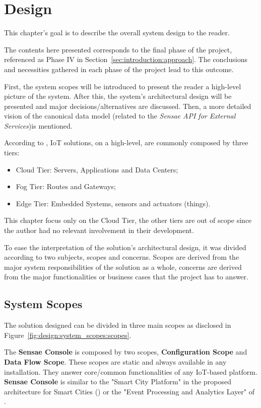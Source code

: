 \chapter{Design}
\label{chap:design}

This chapter's goal is to describe the overall system design to the reader.

The contents here presented corresponds to the final phase of the project, referenced as Phase IV in Section~\ref{sec:introduction:approach}. The conclusions and necessities gathered in each phase of the project lead to this outcome. 

First, the system scopes will be introduced to present the reader a high-level picture of the system. After this, the system's architectural design will be presented and major decisions/alternatives are discussed. Then, a more detailed vision of the canonical data model (related to the \textit{Sensae API for External Services})is mentioned.

According to \cite{DIAS2022100529}, \gls{IoT} solutions, on a high-level, are commonly composed by three tiers:

\begin{itemize}
   \item Cloud Tier: Servers, Applications and Data Centers;
   \item Fog Tier: Routes and Gateways;
   \item Edge Tier: Embedded Systems, sensors and actuators (things).
\end{itemize}

This chapter focus only on the Cloud Tier, the other tiers are out of scope since the author had no relevant involvement in their development.

To ease the interpretation of the solution's architectural design, it was divided according to two subjects, scopes and concerns.
Scopes are derived from the major system responsibilities of the solution as a whole, concerns are derived from the major functionalities or business cases that the project has to answer.

\section{System Scopes}
\label{sec:design:system_scopes}

The solution designed can be divided in three main scopes as disclosed in Figure~\ref{fig:design:system_scopes:scopes}.

The \textbf{Sensae Console} is composed by two scopes, \textbf{Configuration Scope} and \textbf{Data Flow Scope}. These scopes are static and always available in any installation. They answer core/common functionalities of any \gls{IoT}-based platform. \textbf{Sensae Console} is similar to the "Smart City Platform" in the proposed architecture for Smart Cities () or the "Event Processing and Analytics Layer" of .

